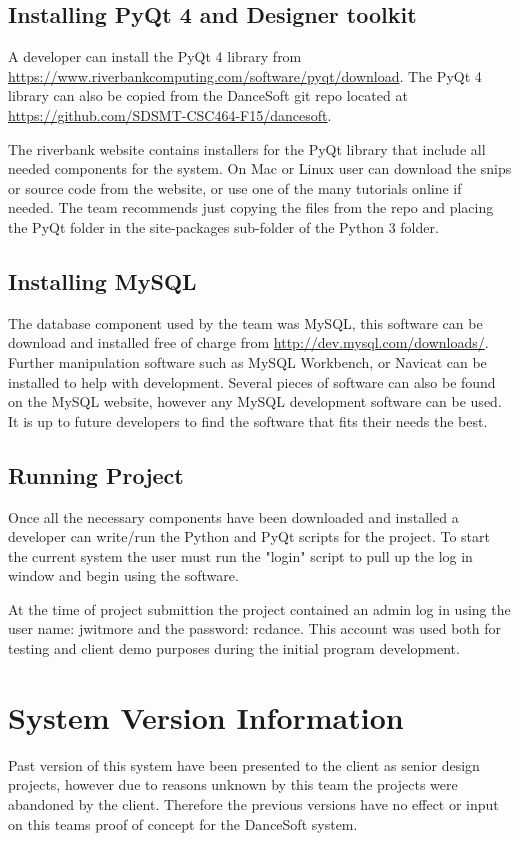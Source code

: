 \subsection{Installing PyQt 4 and Designer toolkit }

A developer can install the PyQt 4 library from \url{https://www.riverbankcomputing.com/software/pyqt/download}. The PyQt 4 library can also be copied from the DanceSoft git repo located at \url{https://github.com/SDSMT-CSC464-F15/dancesoft}.

The riverbank website contains installers for the PyQt library that include all needed components for the system. On Mac or Linux user can download the snips or source code from the website, or use one of the many tutorials online if needed. The team recommends just copying the files from the repo and placing the PyQt folder in the site-packages sub-folder of the Python 3 folder. 

\subsection{Installing MySQL}
The database component used by the team was MySQL, this software can be download and installed free of charge from \url{http://dev.mysql.com/downloads/}. Further manipulation software such as MySQL Workbench, or Navicat can be installed to help with development. Several pieces of  software can also be found on the MySQL website, however any MySQL development software can be used. It is up to future developers to find the software that fits their needs the best.

\subsection{Running Project}
Once all the necessary components have been downloaded and installed a developer can write/run the Python and PyQt scripts for the project. To start the current system the user must run the "login" script to pull up the log in window and begin using the software. 

At the time of project submittion the project contained an admin log in using the user name: jwitmore and the password: rcdance. This account was used both for testing and client demo purposes during the initial program development.

\section{System Version Information}
Past version of this system have been presented to the client as senior design projects, however due to reasons unknown by this team the projects were abandoned by the client. Therefore the previous versions have no effect or input on this teams proof of concept for the DanceSoft system. 

